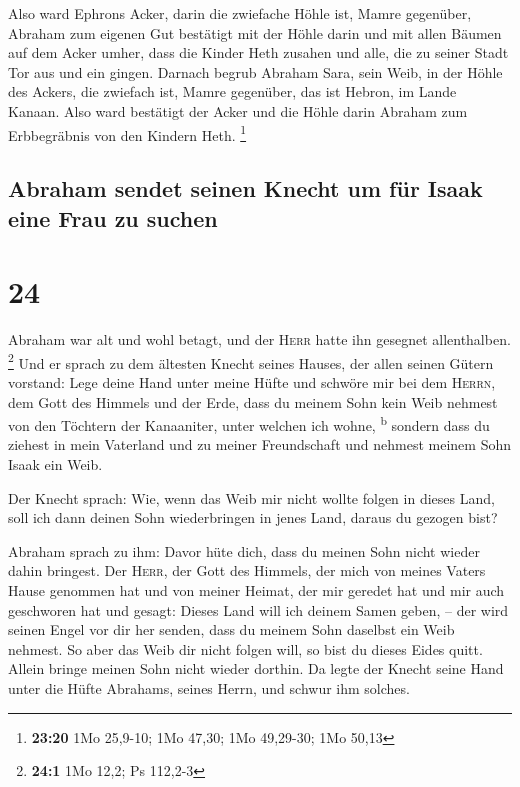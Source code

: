  Also ward Ephrons Acker, darin die zwiefache Höhle ist,
Mamre gegenüber, Abraham zum eigenen Gut bestätigt mit der Höhle darin
und mit allen Bäumen auf dem Acker umher,  dass die
Kinder Heth zusahen und alle, die zu seiner Stadt Tor aus und ein
gingen.  Darnach begrub Abraham Sara, sein Weib, in der
Höhle des Ackers, die zwiefach ist, Mamre gegenüber, das ist Hebron, im
Lande Kanaan.  Also ward bestätigt der Acker und die
Höhle darin Abraham zum Erbbegräbnis von den Kindern Heth. \footnote{\textbf{23:20}
  1Mo 25,9-10; 1Mo 47,30; 1Mo 49,29-30; 1Mo 50,13}

\hypertarget{abraham-sendet-seinen-knecht-um-fuxfcr-isaak-eine-frau-zu-suchen}{%
\subsection{Abraham sendet seinen Knecht um für Isaak eine Frau zu
suchen}\label{abraham-sendet-seinen-knecht-um-fuxfcr-isaak-eine-frau-zu-suchen}}

\hypertarget{section-23}{%
\section{24}\label{section-23}}

 Abraham war alt und wohl betagt, und der \textsc{Herr}
hatte ihn gesegnet allenthalben. \footnote{\textbf{24:1} 1Mo 12,2; Ps
  112,2-3}  Und er sprach zu dem ältesten Knecht seines
Hauses, der allen seinen Gütern vorstand: Lege deine Hand unter meine
Hüfte  und schwöre mir bei dem \textsc{Herrn}, dem Gott
des Himmels und der Erde, dass du meinem Sohn kein Weib nehmest von den
Töchtern der Kanaaniter, unter welchen ich wohne, \textsuperscript{b}
 sondern dass du ziehest in mein Vaterland und zu meiner
Freundschaft und nehmest meinem Sohn Isaak ein Weib.

 Der Knecht sprach: Wie, wenn das Weib mir nicht wollte
folgen in dieses Land, soll ich dann deinen Sohn wiederbringen in jenes
Land, daraus du gezogen bist?

 Abraham sprach zu ihm: Davor hüte dich, dass du meinen
Sohn nicht wieder dahin bringest.  Der \textsc{Herr}, der
Gott des Himmels, der mich von meines Vaters Hause genommen hat und von
meiner Heimat, der mir geredet hat und mir auch geschworen hat und
gesagt: Dieses Land will ich deinem Samen geben, -- der wird seinen
Engel vor dir her senden, dass du meinem Sohn daselbst ein Weib nehmest.
 So aber das Weib dir nicht folgen will, so bist du dieses
Eides quitt. Allein bringe meinen Sohn nicht wieder dorthin.
 Da legte der Knecht seine Hand unter die Hüfte Abrahams,
seines Herrn, und schwur ihm solches.

